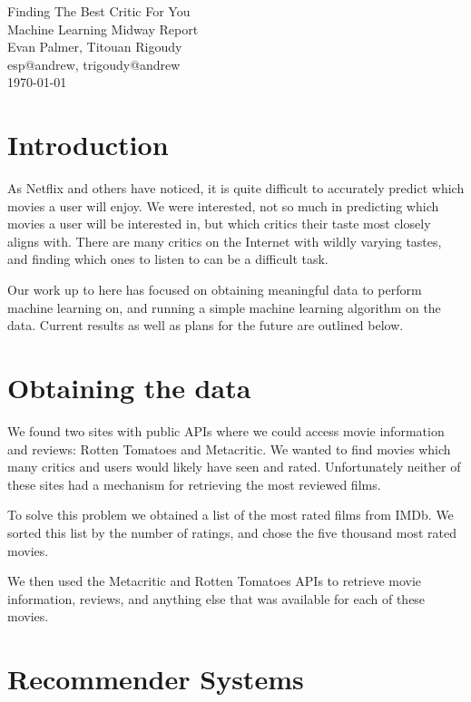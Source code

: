 \documentclass[12pt]{article}
\makeatletter
\newcommand{\myname}{Evan Palmer, Titouan Rigoudy}
\newcommand{\myandrew}{esp@andrew, trigoudy@andrew}
\newcommand{\thedate}{\today}
\makeatother
\begin{document}
	\medskip    
	\thispagestyle{plain}
	\begin{center}                 
	{\LARGE Finding The Best Critic For You} \\
	\medskip
	Machine Learning Midway Report \\
	\smallskip
	\myname \\
	\myandrew \\
	\thedate \\
	\end{center}
	\vspace{0.5cm}

\section{Introduction}

As Netflix and others have noticed, it is quite difficult to accurately predict which movies a user will enjoy. We were interested, not so much in predicting which movies a user will be interested in, but which critics their taste most closely aligns with. There are many critics on the Internet with wildly varying tastes, and finding which ones to listen to can be a difficult task.

Our work up to here has focused on obtaining meaningful data to perform machine learning on, and running a simple machine learning algorithm on the data. Current results as well as plans for the future are outlined below.

\section{Obtaining the data}

	We found two sites with public APIs where we could access movie information and reviews: Rotten Tomatoes and Metacritic. We wanted to find movies which many critics and users would likely have seen and rated. Unfortunately neither of these sites had a mechanism for retrieving the most reviewed films. 

	To solve this problem we obtained a list of the most rated films from IMDb. We sorted this list by the number of ratings, and chose the five thousand most rated movies. 

	We then used the Metacritic and Rotten Tomatoes APIs to retrieve movie information, reviews, and anything else that was available for each of these movies.


\section{Recommender Systems}
\end{document}
